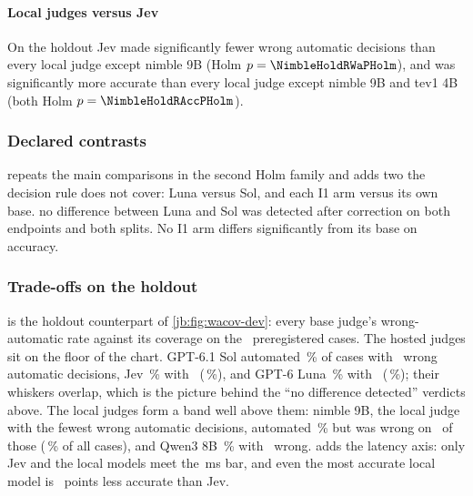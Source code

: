 \paragraph{Local judges versus Jev} On the holdout Jev made significantly fewer wrong automatic
decisions than every local judge except nimble 9B (Holm $p = \NimbleHoldRWaPHolm$), and was significantly
more accurate than every local judge except nimble 9B and tev1 4B (both Holm $p = \NimbleHoldRAccPHolm$).

\subsubsection{Declared contrasts}

\begin{table}[tbp]
\centering\small
\caption{The \HoldPairwiseFamily\ contrasts declared in the run configuration, on both splits, for
accuracy and wrong-automatic rate. $A-B$ in percentage points; Holm correction within this family.
Bold Holm $p \le 0.05$.}
\label{jb:tab:pairwise}

\end{table}

 repeats the main comparisons in the second Holm family and adds two the decision
rule does not cover: Luna versus Sol, and each I1 arm versus its own base. no difference between Luna and Sol was detected after correction
on both endpoints and both splits. No I1 arm differs significantly from its base on accuracy.

\subsubsection{Trade-offs on the holdout}

 is the holdout counterpart of \cref{jb:fig:wacov-dev}: every base judge's
wrong-automatic rate against its coverage on the \HoldN\ preregistered cases. The hosted judges sit on
the floor of the chart. GPT-6.1 Sol automated \SolHoldCovPct\,\% of cases with \SolHoldWaK\ wrong
automatic decisions, Jev \JevHoldCovPct\,\% with \JevHoldWaK\ (\JevHoldWaPct\,\%), and GPT-6 Luna
\LunaHoldCovPct\,\% with \LunaHoldWaK\ (\LunaHoldWaPct\,\%); their whiskers overlap, which is the
picture behind the ``no difference detected'' verdicts above. The local judges form a band well above them: nimble
9B, the local judge with the fewest wrong automatic decisions, automated \NimbleHoldCovPct\,\% but was wrong on \NimbleHoldWaK\ of those
(\NimbleHoldWaPct\,\% of all cases), and Qwen3 8B \QwenEightHoldCovPct\,\% with \QwenEightHoldWaK\ wrong.
 adds the latency axis: only Jev and the local models meet the
\RuleOneMaxPninetyfive\,ms bar, and even the most accurate local model is \LocalHoldAccGap\ points less
accurate than Jev.





